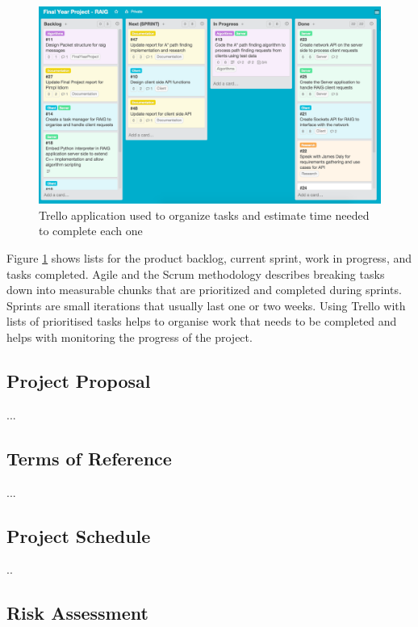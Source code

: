 \documentclass[12pt,a4paper,titlepage]{article}
\begin{document}
\begin{figure}[H]
	\centering
    	\includegraphics[width=\textwidth]{Figures/trellowithtasks}
	\caption{Trello application used to organize tasks and estimate time needed to complete each one}
	\label{fig:trellowithtasks}
\end{figure}

\noindent
Figure \ref{fig:trellowithtasks} shows lists for the product backlog, current sprint, work in progress, and tasks completed. Agile and the Scrum methodology describes breaking tasks down into measurable chunks that are prioritized and completed during sprints. Sprints are small iterations that usually last one or two weeks. Using Trello with lists of prioritised tasks helps to organise work that needs to be completed and helps with monitoring the progress of the project. \\

\subsection{Project Proposal}

...

\subsection{Terms of Reference}

...

\subsection{Project Schedule}

..

\subsection{Risk Assessment}
\end{document}
